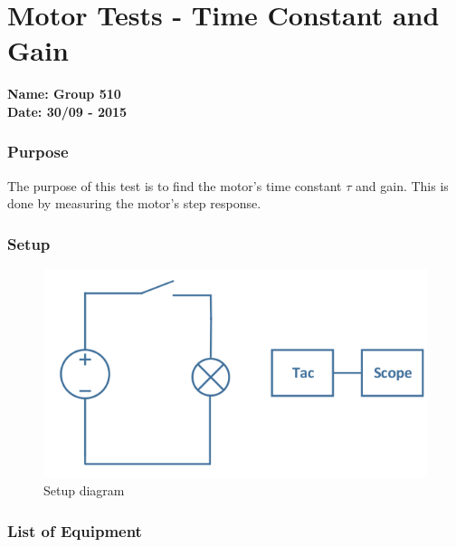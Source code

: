 \pagebreak
\section{Motor Tests - Time Constant and Gain} \label{app:motorTestTimeConstantAndGain}
\textbf{Name: Group 510}\\
\textbf{Date: 30/09 - 2015}

\subsubsection{Purpose}
The purpose of this test is to find the motor's time constant $\tau$ and gain. This is done by measuring the motor's step response.

\subsubsection{Setup}
\begin{figure}[H]
  \centering
	\includegraphics[scale=0.5]{figures/MotorTest8.png}
	\caption{Setup diagram}
\end{figure}\vspace{-5mm}

\subsubsection{List of Equipment}

